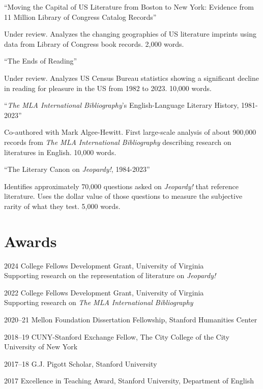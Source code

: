 \documentclass[12pt,letterpaper]{report}
\begin{document}
\medskip

\enquote{Moving the Capital of US Literature from Boston to New York: Evidence from 11 Million Library of Congress Catalog Records}

\begin{adjustwidth}{2em}{}
	Under review. Analyzes the changing geographies of US literature imprints using data from Library of Congress book records. 2,000 words.
\end{adjustwidth}

\medskip

\enquote{The Ends of Reading}

\begin{adjustwidth}{2em}{}
	Under review. Analyzes US Census Bureau statistics showing a significant decline in reading for pleasure in the US from 1982 to 2023. 10,000 words.
\end{adjustwidth}

\medskip

\enquote{\emph{The MLA International Bibliography}'s English-Language Literary History, 1981-2023}

\begin{adjustwidth}{2em}{}
	Co-authored with Mark Algee-Hewitt. First large-scale analysis of about 900,000 records from \textit{The MLA International Bibliography} describing research on literatures in English. 10,000 words.
\end{adjustwidth}

\medskip

\enquote{The Literary Canon on \emph{Jeopardy!}, 1984-2023}

\begin{adjustwidth}{2em}{}
	Identifies approximately 70,000 questions asked on \emph{Jeopardy!} that reference literature. Uses the dollar value of those questions to measure the subjective rarity of what they test. 5,000 words.
\end{adjustwidth}

\section*{Awards}

\begin{tablist}
	\item[2024] \tab{}College Fellows Development Grant, University of Virginia \\
	Supporting research on the representation of literature on \textit{Jeopardy!}
	\item[2022] \tab{}College Fellows Development Grant, University of Virginia \\
	Supporting research on \textit{The MLA International Bibliography}
	\item[2020--21] \tab{}Mellon Foundation Dissertation Fellowship, Stanford Humanities Center
	\item[2018--19] \tab{}CUNY-Stanford Exchange Fellow, The City College of the City University of New York
	\item[2017--18] \tab{}G.J. Pigott Scholar, Stanford University
	\item[2017] \tab{}Excellence in Teaching Award, Stanford University, Department of English
\end{tablist}
\end{document}
